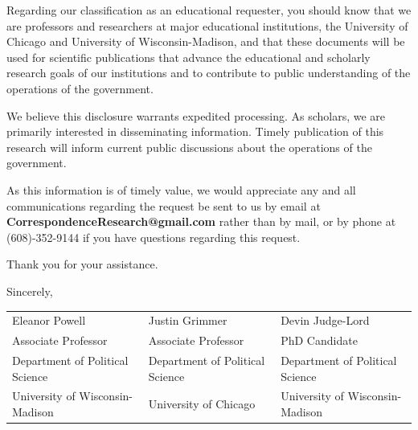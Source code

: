 \documentclass{article}
\begin{document}
%
Regarding our classification as an educational requester, you should know that we are professors and researchers at major educational institutions, the University of Chicago and University of Wisconsin-Madison, and that these documents will be used for scientific publications that advance the educational and scholarly research goals of our institutions and to contribute to public understanding of the operations of the government. 
%
 
We believe this disclosure warrants expedited processing. As scholars, we are primarily interested in disseminating information. Timely publication of this research will inform current public discussions about the operations of the government.
 
As this information is of timely value, we would appreciate any and all communications regarding the request be sent to us by email at \textbf{CorrespondenceResearch@gmail.com} rather than by mail, or by phone at (608)-352-9144 if you have questions regarding this request.
 
Thank you for your assistance.
 
Sincerely,

\begin{tabular}{lll}
Eleanor Powell & Justin Grimmer & Devin Judge-Lord\\
Associate Professor & Associate Professor & PhD Candidate\\
Department of Political Science & Department of Political Science & Department of Political Science\\
University of Wisconsin-Madison & University of Chicago & University of Wisconsin-Madison
\end{tabular}

 
\end{document}
